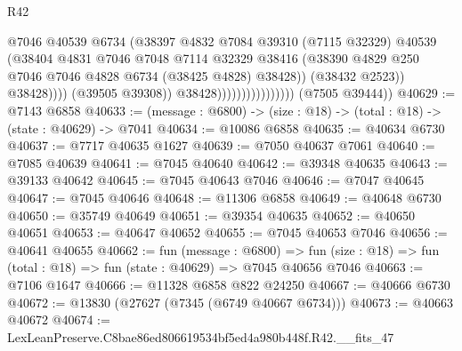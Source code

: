 \begin{lexlean}{R42}
\begin{coremodule}
{                                                @7046
                                                @40539
                                                @6734
                                                (@38397
                                                  @4832
                                                  @7084
                                                  @39310
                                                  (@7115 @32329)
                                                  @40539
                                                  (@38404
                                                    @4831
                                                    @7046
                                                    @7048
                                                    @7114
                                                    @32329
                                                    @38416
                                                    (@38390
                                                      @4829
                                                      @250
                                                      @7046
                                                      @7046
                                                      @4828
                                                      @6734
                                                      (@38425 @4828)
                                                      @38428))
                                                  (@38432 @2523))
                                                @38428))))
                                        (@39505 @39308))
                                      @38428))))))))))))))))
      (@7505 @39444))
@40629 := @7143 @6858
@40633 := (message : @6800) -> (size : @18) -> (total : @18) -> (state : @40629) -> @7041
@40634 := @10086 @6858
@40635 := @40634 @6730
@40637 := @7717 @40635 @1627
@40639 := @7050 @40637 @7061
@40640 := @7085 @40639
@40641 := @7045 @40640
@40642 := @39348 @40635
@40643 := @39133 @40642
@40645 := @7045 @40643 @7046
@40646 := @7047 @40645
@40647 := @7045 @40646
@40648 := @11306 @6858
@40649 := @40648 @6730
@40650 := @35749 @40649
@40651 := @39354 @40635
@40652 := @40650 @40651
@40653 := @40647 @40652
@40655 := @7045 @40653 @7046
@40656 := @40641 @40655
@40662 := fun (message : @6800) =>
  fun (size : @18) => fun (total : @18) => fun (state : @40629) => @7045 @40656 @7046
@40663 := @7106 @1647
@40666 := @11328 @6858 @822 @24250
@40667 := @40666 @6730
@40672 := @13830 (@27627 (@7345 (@6749 @40667 @6734)))
@40673 := @40663 @40672
@40674 := LexLeanPreserve.C8bae86ed806619534bf5ed4a980b448f.R42.__fits_47
}
\end{coremodule}
\end{lexlean}
